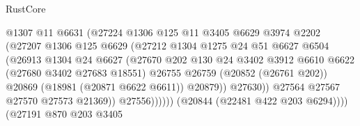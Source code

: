 \begin{lexlean}{RustCore}
\begin{coremodule}
                                      @1307
                                      @11
                                      @6631
                                      (@27224
                                        @1306
                                        @125
                                        @11
                                        @3405
                                        @6629
                                        @3974
                                        @2202
                                        (@27207
                                          @1306
                                          @125
                                          @6629
                                          (@27212
                                            @1304
                                            @1275
                                            @24
                                            @51
                                            @6627
                                            @6504
                                            (@26913
                                              @1304
                                              @24
                                              @6627
                                              (@27670
                                                @202
                                                @130
                                                @24
                                                @3402
                                                @3912
                                                @6610
                                                @6622
                                                (@27680 @3402 @27683 @18551)
                                                @26755
                                                @26759
                                                (@20852 (@26761 @202))
                                                @20869
                                                (@18981 (@20871 @6622 @6611))
                                                @20879))
                                            @27630))
                                        @27564
                                        @27567
                                        @27570
                                        @27573
                                        @21369))
                                    @27556))))))
                        (@20844 (@22481 @422 @203 @6294))))
                    (@27191
                      @870
                      @203
                      @3405

\end{coremodule}
\end{lexlean}
